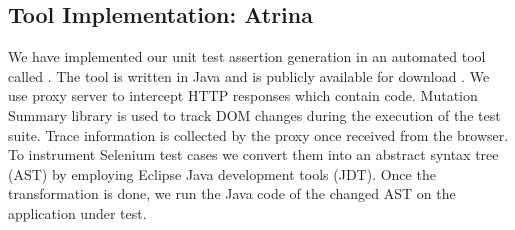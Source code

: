 \subsection{Tool Implementation: Atrina} \label{Sec:tool}
We have implemented our \javascript unit test assertion generation in an automated tool called \atrina. The tool is written in Java and is publicly available for download \cite{atrina-dl}.
We use proxy server to intercept HTTP responses which contain \javascript code. \javascript Mutation Summary library \cite{mutationSummary} is used to track DOM changes during the execution of the test suite. Trace information is collected by the proxy once received from the browser. To instrument Selenium test cases we convert them into an abstract syntax tree (AST) by employing Eclipse Java development tools (JDT). Once the transformation is done, we run the Java code of the changed AST on the application under test.   


